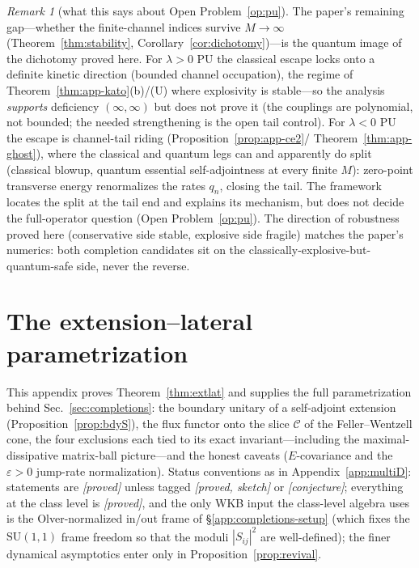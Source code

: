 \documentclass[11pt]{article}
\theoremstyle{definition}
\theoremstyle{remark}
\newtheorem{remark}[theorem]{Remark}
\begin{document}
\begin{remark}[what this says about Open Problem~\ref{op:pu}]
The paper's remaining gap---whether the finite-channel indices survive
$M\to\infty$ (Theorem~\ref{thm:stability},
Corollary~\ref{cor:dichotomy})---is the quantum image of the dichotomy
proved here. For $\lambda>0$ PU the classical escape locks onto a
definite kinetic direction (bounded channel occupation), the regime of
Theorem~\ref{thm:app-kato}(b)/(U) where explosivity is stable---so the
analysis \emph{supports} deficiency $(\infty,\infty)$ but does not
prove it (the couplings are polynomial, not bounded; the needed
strengthening is the open tail control). For $\lambda<0$ PU the escape
is channel-tail riding (Proposition~\ref{prop:app-ce2}/
Theorem~\ref{thm:app-ghost}), where the classical and quantum legs can
and apparently do split (classical blowup, quantum essential
self-adjointness at every finite $M$): zero-point transverse energy
renormalizes the rates $q_{n}$, closing the tail. The framework locates
the split at the tail end and explains its mechanism, but does not
decide the full-operator question (Open Problem~\ref{op:pu}). The
direction of robustness proved here (conservative side stable,
explosive side fragile) matches the paper's numerics: both completion
candidates sit on the classically-explosive-but-quantum-safe side,
never the reverse.
\end{remark}

\section{The extension--lateral parametrization}
\label{app:completions}

This appendix proves Theorem~\ref{thm:extlat} and supplies the full
parametrization behind Sec.~\ref{sec:completions}: the boundary unitary
of a self-adjoint extension (Proposition~\ref{prop:bdyS}), the flux
functor onto the slice $\mathcal C$ of the Feller--Wentzell cone, the
four exclusions each tied to its exact invariant---including the
maximal-dissipative matrix-ball picture---and the honest caveats
($E$-covariance and the $\varepsilon>0$ jump-rate normalization).
Status conventions as in Appendix~\ref{app:multiD}: statements are
\emph{[proved]} unless tagged \emph{[proved, sketch]} or
\emph{[conjecture]}; everything at the class level is \emph{[proved]},
and the only WKB input the class-level algebra uses is the
Olver-normalized in/out frame of \S\ref{app:completions-setup} (which
fixes the $\mathrm{SU}(1,1)$ frame freedom so that the moduli
$|S_{ij}|^{2}$ are well-defined); the finer dynamical asymptotics enter
only in Proposition~\ref{prop:revival}.
\end{document}
